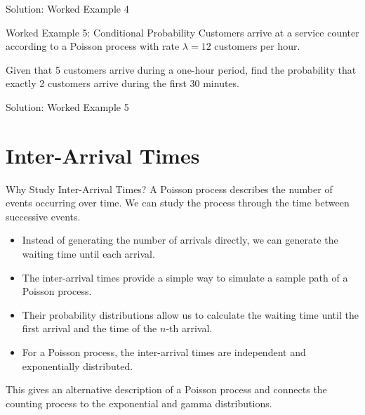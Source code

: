 \documentclass[
  ignorenonframetext,
  aspectratio=169,
]{beamer}
\providecommand{\tightlist}{%
  \setlength{\itemsep}{0pt}\setlength{\parskip}{0pt}}
\begin{document}
\begin{frame}{Solution: Worked Example 4}
\protect{}\label{solution-worked-example-4}
\end{frame}

\begin{frame}{Worked Example 5: Conditional Probability}
\protect{}\label{worked-example-5-conditional-probability}
Customers arrive at a service counter according to a Poisson process
with rate \(\lambda=12\) customers per hour.

Given that 5 customers arrive during a one-hour period, find the
probability that exactly 2 customers arrive during the first 30 minutes.
\end{frame}

\begin{frame}{Solution: Worked Example 5}
\protect{}\label{solution-worked-example-5}
\end{frame}

\section{Inter-Arrival Times}\label{inter-arrival-times}

\begin{frame}{Why Study Inter-Arrival Times?}
\protect{}\label{why-study-inter-arrival-times}
A Poisson process describes the number of events occurring over time. We
can study the process through the time between successive events.

\begin{itemize}
\tightlist
\item
  Instead of generating the number of arrivals directly, we can generate
  the waiting time until each arrival.
\item
  The inter-arrival times provide a simple way to simulate a sample path
  of a Poisson process.
\item
  Their probability distributions allow us to calculate the waiting time
  until the first arrival and the time of the \(n\)-th arrival.
\item
  For a Poisson process, the inter-arrival times are independent and
  exponentially distributed.
\end{itemize}

This gives an alternative description of a Poisson process and connects
the counting process to the exponential and gamma distributions.
\end{frame}
\end{document}
